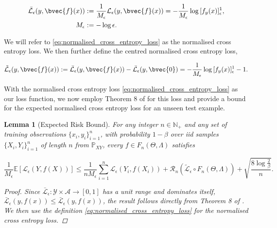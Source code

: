 \documentclass{article}
\newtheorem{lemma}[theorem]{Lemma}
\begin{document}
		\begin{equation}
			\begin{aligned}
				\bar{\mathcal{L}}_{\epsilon}(y, \bvec{f}(x)) &:= \frac{1}{M_{\epsilon}} \mathcal{L}_{\epsilon}(y, \bvec{f}(x)) = - \frac{1}{M_{\epsilon}} \log{ [f_{y}(x)]_{\epsilon}^{1} }, \\
				M_{\epsilon} &:= - \log{\epsilon}.
			\end{aligned}
		\label{eq:normalised_cross_entropy_loss}
		\end{equation}
		
		We will refer to \eqref{eq:normalised_cross_entropy_loss} as the normalised cross entropy loss. We then further define the centred normalised cross entropy loss,
		
		\begin{equation}
			\tilde{\mathcal{L}}_{\epsilon}(y, \bvec{f}(x)) := \bar{\mathcal{L}}_{\epsilon}(y, \bvec{f}(x)) - \bar{\mathcal{L}}_{\epsilon}(y, \bvec{0}) = - \frac{1}{M_{\epsilon}} \log{ [f_{y}(x)]_{\epsilon}^{1} } - 1.
		\label{eq:centred_normalised_cross_entropy_loss}
		\end{equation}
		
		With the normalised cross entropy loss \eqref{eq:normalised_cross_entropy_loss} as our loss function, we now employ Theorem 8 of \cite{bartlett2002rademacher} for this loss and provide a bound for the expected normalised cross entropy loss for an unseen test example.
		
		\begin{lemma}[Expected Risk Bound]
		\label{thm:expected_normalised_cross_entropy_loss_bound}
			For any integer $n \in \mathbb{N}_{+}$ and any set of training observations $\{x_{i}, y_{i}\}_{i = 1}^{n}$, with probability $1 - \beta$ over \textit{iid} samples $\{X_{i}, Y_{i}\}_{i = 1}^{n}$ of length $n$ from $\mathbb{P}_{X Y}$, every $f \in F_{n}(\Theta, \Lambda)$ satisfies
			
			\begin{equation}
				\frac{1}{M_{\epsilon}} \mathbb{E}[\mathcal{L}_{\epsilon}(Y, f(X))] \leq \frac{1}{n M_{\epsilon}} \sum_{i = 1}^{n} \mathcal{L}_{\epsilon}(Y_{i}, f(X_{i})) + \mathcal{R}_{n}(\tilde{\mathcal{L}}_{\epsilon} \circ F_{n}(\Theta, \Lambda)) + \sqrt{\frac{8 \log{\frac{2}{\beta}}}{n}}.
			\label{eq:expected_loss_bound}
			\end{equation}
			
			\begin{proof}
				Since $\bar{\mathcal{L}}_{\epsilon} : \mathcal{Y} \times \mathcal{A} \to [0, 1]$ has a unit range and dominates itself, $\bar{\mathcal{L}}_{\epsilon}(y, f(x)) \leq \bar{\mathcal{L}}_{\epsilon}(y, f(x))$, the result follows directly from Theorem 8 of \cite{bartlett2002rademacher}. We then use the definition \eqref{eq:normalised_cross_entropy_loss} for the normalised cross entropy loss.
			\end{proof}
		\end{lemma}
		
\end{document}
